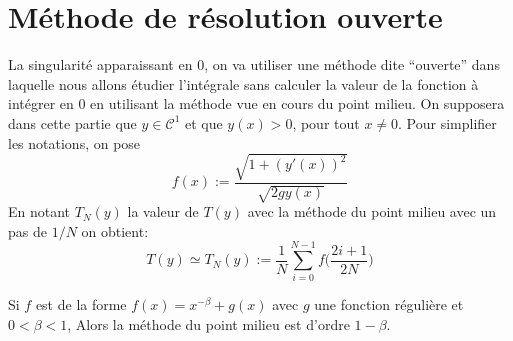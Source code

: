 \documentclass[a4paper,10pt]{article}
\begin{document}
\section{M\'ethode de r\'esolution ouverte}
La singularit\'e apparaissant en 0, on va utiliser une m\'ethode dite ``ouverte'' dans laquelle nous allons \'etudier l'int\'egrale sans calculer la valeur de la fonction \`a int\'egrer en 0 en utilisant
la m\'ethode vue en cours du point milieu.
\newline
On supposera dans cette partie que $y\in \mathcal{C}^1$ et que $y(x) > 0$, pour tout $x \neq 0$.
Pour simplifier les notations, on pose
\begin{equation}
 f(x) := \frac{\sqrt{1+(y'(x))^2}}{\sqrt{2gy(x)}}
\end{equation}
En notant $T_N(y)$ la valeur de $T(y)$ avec la m\'ethode du point milieu avec un pas de $1/N$ on obtient:
\begin{equation}
 T(y) \simeq T_N(y) := \frac{1}{N}\sum_{i = 0}^{N-1} f\Big(\frac{2i + 1}{2N}\Big)
\end{equation}
\begin{theorem}
 Si $f$ est de la forme $f(x) = x^{-\beta} + g(x)$ avec $g$ une fonction r\'eguli\`ere et $0 < \beta < 1$, Alors la m\'ethode du point milieu est d'ordre $1 - \beta$. 
\end{theorem}
\end{document}
